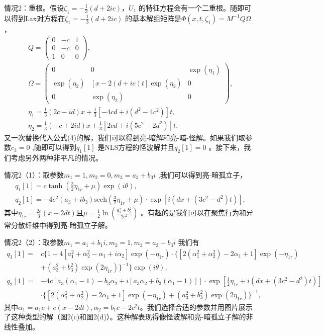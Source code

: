 \documentclass[11pt,a4paper]{ctexart}
\begin{document}
情况2：重根。假设$ \zeta_{1} =-\frac{1}{3}(d+2ic) $，$ U_{1}  $ 的特征方程会有一个二重根。随即可以得到Lax对方程在$ \zeta_{1} =-\frac{1}{3}(d+2ic) $ 的基本解组矩阵是$ \Phi(x,t,\zeta_{1} )=M^{-1}Q\Omega    $ ，
\begin{gather*}
	Q=\begin{pmatrix}
		0 & -c & 1 \\
		0 & -c & 0 \\
		1 & 0  & 0
	\end{pmatrix},\\
	\Omega=\begin{pmatrix}
		0               & 0                           & \exp(\eta_{1} ) \\
		\exp(\eta_{2} ) & [x-2(d+ic)t]\exp(\eta_{2} ) & 0               \\
		0               & \exp(\eta_{2} )             & 0
	\end{pmatrix},\\
	\eta_{1} =\frac{1}{3}(2c-id)x+\frac{1}{3}[-4cd+i(d^{2} -4c^{2} )]t,\\
	\eta_{2} =\frac{1}{3}(-c+2id)x+\frac{1}{3}[2cd+i(5c^{2} -2d^{2} )]t.
\end{gather*}
又一次替换代入公式(4)的解，我们可以得到亮-暗解和亮-暗-怪解。如果我们取参数$ c_{3} =0 $ ,随即可以得到$ q_{1} [1] $ 是NLS方程的怪波解并且$ q_{2} [1]=0 $ 。接下来，我们考虑另外两种非平凡的情况。

情况2（1）：取参数$ m_{1} =1,m_{2} =0 ,m_{3} =a_{3} +b_{3} i $ ,我们可以得到亮-暗孤立子，
\begin{gather*}
	q_{1} [1]=c\tanh(\frac{3}{2}\eta_{1r} +\mu)\exp(i\theta),\\
	q_{2} [1]=-4c^{2} (a_{3} +ib_{3} )\text{sech}(\frac{3}{2}\eta_{1r} +\mu)\cdot\exp[i(dx+(3c^{2} -d^{2} )t)],
\end{gather*}
其中$ \eta_{1r} =\frac{2c}{3}(x-2dt) $且$ \mu=\frac{1}{2}\ln(\frac{a_{3} ^{2} +b_{3} ^{2} }{2c^{2} }) $ 。有趣的是我们可以在聚焦行为和异常分散纤维中得到亮-暗孤立子解。

情况2（2）：取参数$ m_{1} =a_{1} +b_{1} i,m_{2} =1,m_{3} =a_{3} +b_{3} i $ 我们有
\begin{align*}
	q_{1} [1]= & c\{1-4[a_{1} ^{2} +\alpha_{2} ^{2} -\alpha_{1} +i\alpha_{2} ]\exp(-\eta_{1r} )\cdot\{[2(\alpha_{1} ^{2} +\alpha_{2} ^{2} )-2\alpha_{1} +1]\exp(-\eta_{1r} ) \\
	           & +(a_{3} ^{2} +b_{3} ^{2} )\exp(2\eta_{1r} )\}^{-1}\}\exp(i\theta),                                                                                          \\
	q_{2} [1]= & -4c[a_{3} (\alpha_{1} -1)-b_{3} \alpha_{2} +i[a_{3} \alpha_{2} +b_{3} (\alpha_{1} -1)]]\cdot\exp[\frac{1}{2}\eta_{1r} +i(dx+(3c^{2} -d^{2} )t)]             \\
	           & \cdot\{[2(\alpha_{1} ^{2} +\alpha_{2} ^{2} )-2\alpha_{1} +1]\exp(-\eta_{1r} )+(a_{3} ^{2} +b_{3} ^{2} )\exp(2\eta_{1r} )\}^{-1} ,
\end{align*}
其中$ \alpha_{1} =a_{1} c+c(x-2dt),\alpha_{2} =b_{1} c-2c^{2} t $。我们选择合适的参数并用图片展示了这种类型的解（图2(c)和图2(d)）。这种解表现得像怪波解和亮-暗孤立子解的非线性叠加。
\end{document}
